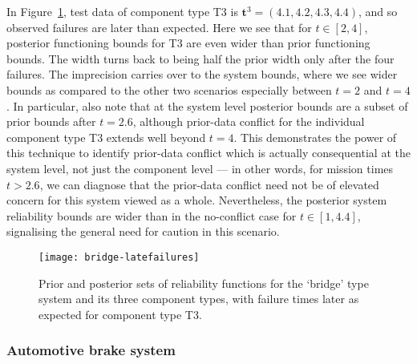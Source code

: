 \documentclass[12pt, a4paper]{elsarticle}
\newcommand{\bs}[1]{\boldsymbol{#1}}
\renewcommand{\vec}[1]{{\bs#1}}
\begin{document}
In Figure~\ref{fig:bridge-late}, 
test data of component type T3 is $\vec{t}^3 = (4.1, 4.2, 4.3, 4.4)$,
and so observed failures are later than expected.
Here we see that for $t \in [2,4]$,
posterior functioning bounds for T3 are even wider than prior functioning bounds.
The width turns back to being half the prior width
only after the four failures.
The imprecision carries over to the system bounds,
where we see wider bounds as compared to the other two scenarios
especially between $t=2$ and $t=4$. In particular, also note
that at the system level posterior bounds are a subset of prior bounds after
$t = 2.6$, although prior-data conflict for the 
individual component type T3 extends well beyond $t=4$.  This 
demonstrates the power of this technique to identify prior-data conflict
which is actually consequential at the system 
level, not just the component level --- in other words, for 
mission times $t>2.6$, we can diagnose that the prior-data conflict 
need not be of elevated concern for this system viewed as a whole.
Nevertheless, the posterior system reliability bounds are wider than in the no-conflict case for $t \in [1, 4.4]$,
signalising the general need for caution in this scenario.

\begin{figure}
\texttt{[image: bridge-latefailures]}
\caption{Prior and posterior sets of reliability functions for the `bridge' type system and its three component types,
with failure times later as expected for component type T3.}
\label{fig:bridge-late}
\end{figure}

\subsubsection{Automotive brake system}
\end{document}
